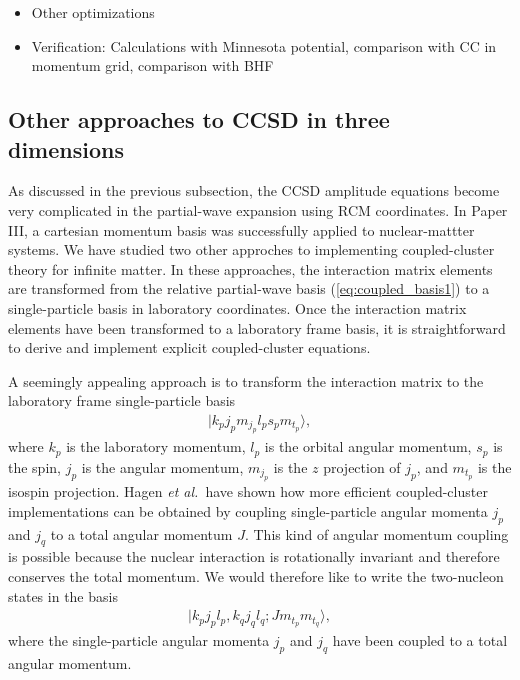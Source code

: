 \documentclass[a4paper,12pt]{report}
\begin{document}

\begin{itemize}
\item Other optimizations
\item Verification: Calculations with Minnesota potential, 
  comparison with CC in momentum grid, comparison with
  BHF 
\end{itemize}


\subsection{Other approaches to CCSD in three dimensions}

As discussed in the previous subsection, the CCSD amplitude 
equations become very complicated in the partial-wave 
expansion using RCM coordinates. In Paper III, a cartesian
momentum basis was successfully applied to nuclear-mattter
systems. We have studied two other approches to 
implementing coupled-cluster theory for infinite matter.
In these approaches, the interaction matrix elements are
transformed from the relative partial-wave basis 
(\ref{eq:coupled_basis1}) to a single-particle basis in 
laboratory coordinates. Once the interaction matrix elements
have been transformed to a laboratory frame basis, it is 
straightforward to derive and implement explicit 
coupled-cluster equations.

A seemingly appealing approach is to transform the 
interaction matrix to the laboratory frame single-particle basis
\begin{align}
  |k_{p}j_{p}m_{j_{p}}l_{p}s_{p}m_{t_{p}}\rangle , 
\end{align}
where $k_{p}$ is the laboratory momentum, $l_{p}$ is the orbital
angular momentum, $s_{p}$ is the spin, $j_{p}$ is the angular 
momentum, $m_{j_{p}}$ is the $z$ projection of $j_{p}$, and 
$m_{t_{p}}$ is the isospin projection. Hagen \emph{et al.}~have
shown \cite{hagen2010} how more efficient coupled-cluster
implementations can be obtained by coupling single-particle
angular momenta $j_{p}$ and $j_{q}$ to a total angular momentum
$J$. This kind of angular momentum coupling is possible because 
the nuclear interaction is rotationally invariant 
\cite{ring_schuck} and therefore conserves the total momentum. 
We would therefore like to write the two-nucleon states in the 
basis
\begin{align} \label{eq:coupled_lab}
  |k_{p}j_{p}l_{p},k_{q}j_{q}l_{q};Jm_{t_{p}}m_{t_{q}} \rangle ,
\end{align} 
where the single-particle angular momenta $j_{p}$ and $j_{q}$ 
have been coupled to a total angular momentum. 
\end{document}
